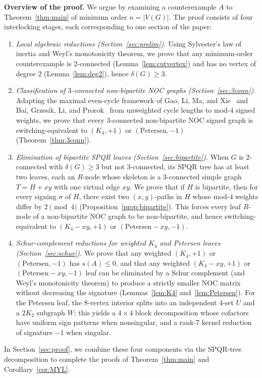 \documentclass[10pt,letterpaper]{article}
\theoremstyle{zetaplain}
\theoremstyle{zetadef}
\theoremstyle{remark}
\numberwithin{equation}{section}
\begin{document}
\medskip
\noindent\textbf{Overview of the proof.}
We argue by examining a counterexample $A$ to Theorem~\ref{thm:main} of minimum order $n = |V(G)|$. The proof consists of four interlocking stages, each corresponding to one section of the paper:
\begin{enumerate}
  \item \emph{Local algebraic reductions (Section~\ref{sec:prelim}).} Using Sylvester's law of inertia and Weyl's monotonicity theorem, we prove that any minimum-order counterexample is $2$-connected (Lemma~\ref{lem:cutvertex}) and has no vertex of degree $2$ (Lemma~\ref{lem:deg2}), hence $\delta(G) \ge 3$.
  \item \emph{Classification of $3$-connected non-bipartite NOC graphs (Section~\ref{sec:3conn}).} Adapting the maximal even-cycle framework of Gao, Li, Ma, and Xie~\cite{GLMX24} and Bai, Grzesik, Li, and Prorok~\cite{BGLP26} from unweighted cycle lengths to mod-$4$ signed weights, we prove that every $3$-connected non-bipartite NOC signed graph is switching-equivalent to $(K_4, +1)$ or $(\mathrm{Petersen}, -1)$ (Theorem~\ref{thm:3conn}).
  \item \emph{Elimination of bipartite SPQR leaves (Section~\ref{sec:bipartite}).} When $G$ is $2$-connected with $\delta(G) \ge 3$ but not $3$-connected, its SPQR tree has at least two leaves, each an $R$-node whose skeleton is a $3$-connected simple graph $T = H + xy$ with one virtual edge $xy$. We prove that if $H$ is bipartite, then for every signing $\sigma$ of $H$, there exist two $(x, y)$-paths in $H$ whose mod-$4$ weights differ by $2 \pmod 4$ (Proposition~\ref{prop:bipartite}). This forces every leaf $R$-node of a non-bipartite NOC graph to be non-bipartite, and hence switching-equivalent to $(K_4 - xy, +1)$ or $(\mathrm{Petersen} - xy, -1)$.
  \item \emph{Schur-complement reductions for weighted $K_4$ and Petersen leaves (Section~\ref{sec:schur}).} We prove that any weighted $(K_4, +1)$ or $(\mathrm{Petersen}, -1)$ has $s(A) \le 0$, and that any weighted $(K_4 - xy, +1)$ or $(\mathrm{Petersen} - xy, -1)$ leaf can be eliminated by a Schur complement (and Weyl's monotonicity theorem) to produce a strictly smaller NOC matrix without decreasing the signature (Lemmas~\ref{lem:K4} and~\ref{lem:Petersen}). For the Petersen leaf, the $8$-vertex interior splits into an independent $4$-set $U$ and a $2K_2$ subgraph $W$; this yields a $4 \times 4$ block decomposition whose cofactors have uniform sign patterns when nonsingular, and a rank-$7$ kernel reduction of signature $-1$ when singular.
\end{enumerate}
In Section~\ref{sec:proof}, we combine these four components via the SPQR-tree decomposition to complete the proofs of Theorem~\ref{thm:main} and Corollary~\ref{cor:MYL}.
\end{document}

